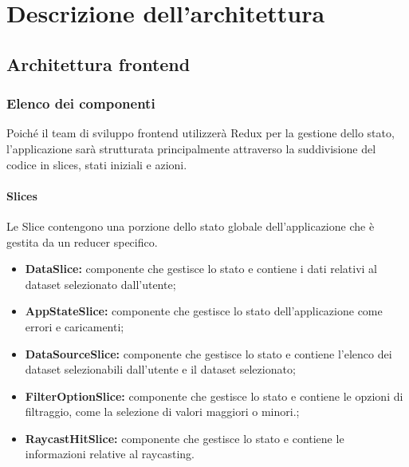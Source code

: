 \section{Descrizione dell'architettura}
\subsection{Architettura frontend}
\subsubsection{Elenco dei componenti}
Poiché il team di sviluppo frontend utilizzerà Redux per la gestione dello stato, l'applicazione sarà strutturata principalmente attraverso la suddivisione del codice in slices, stati iniziali e azioni.
\paragraph{Slices}
    Le Slice contengono una porzione dello stato globale dell’applicazione che è gestita da un reducer
    specifico.
\begin{itemize}
        \item \textbf{DataSlice:} componente che gestisce lo stato e contiene i dati relativi al dataset selezionato dall'utente;
        \item \textbf{AppStateSlice:} componente che gestisce lo stato dell'applicazione come errori e caricamenti;
        \item \textbf{DataSourceSlice:} componente che gestisce lo stato e contiene l'elenco dei dataset selezionabili dall'utente e il dataset selezionato;
        \item \textbf{FilterOptionSlice:} componente che gestisce lo stato e contiene le opzioni di filtraggio, come la selezione di valori maggiori o minori.;
        \item \textbf{RaycastHitSlice:} componente che gestisce lo stato e contiene le informazioni relative al raycasting.
\end{itemize}
